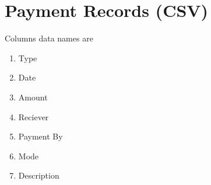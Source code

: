 \documentclass[12pt,a4paper]{article}
\begin{document}
\section*{Payment Records (CSV)}
Columns data names are
\begin{enumerate}
\item Type 
\item Date
\item Amount 
\item Reciever  
\item Payment By  
\item Mode 
\item Description 
\end{enumerate}

\end{document}
